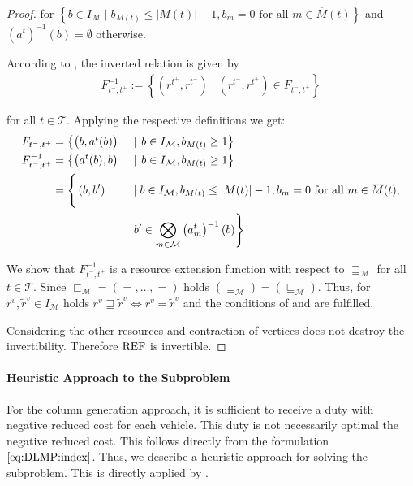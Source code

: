 \begin{proof}
for $\left\{b\in I_{\mathcal{M}}\mid b_{M(t)}\leq\vert M(t)\vert - 1, b_m=0 \text{ for all } m\in\overline{M}(t)\right\}$ and $\left(a^t\right)^{-1}(b) = \emptyset$ otherwise.

According to , the inverted relation is given by
\begin{align*}
	F^{-1}_{t^-,t^+} := \left\{\left(r^{t^+},r^{t^-}\right)\mid \left(r^{t^-},r^{t^+}\right)\in F_{t^-,t^+}\right\}
\end{align*}

for all $t\in\mathcal{T}$. Applying the respective definitions we get:
\begin{align*}
	F_{t^-,t^+} & = \left\{\left(b, a^t(b)\right)\right. && \mid \left. b\in I_{\mathcal{M}}, b_{M(t)}\geq 1\right\} \\
	F^{-1}_{t^-,t^+} & = \left\{\left(a^t(b), b\right)\right. && \mid \left. b\in I_{\mathcal{M}}, b_{M(t)}\geq 1\right\} \\
	& = \left\{\vphantom{\bigotimes_{m\in\mathcal{M}}}\left(b, b'\right)\right. && \mid b\in I_{\mathcal{M}}, b_{M(t)}\leq\vert M(t)\vert-1, b_m=0 \text{ for all } m\in\overline{M}(t), \\
	&&& \left. b'\in\bigotimes_{m\in\mathcal{M}}\left(a^t_m\right)^{-1}(b)\right\}
\end{align*}

We show that $F^{-1}_{t^-,t^+}$ is a resource extension function with respect to $\sqsupseteq_{\mathcal{M}}$ for all $t\in\mathcal{T}$. Since ${\sqsubset_{\mathcal{M}} = \left(=,\dots,=\right)}$ holds ${\left(\sqsupseteq_{\mathcal{M}}\right) = \left(\sqsubseteq_{\mathcal{M}}\right)}$. Thus, for ${r^v,\tilde{r}^v\in I_{\mathcal{M}}}$ holds ${r^v\sqsupseteq\tilde{r}^v\Leftrightarrow r^v = \tilde{r}^v}$ and the conditions of  and  are fulfilled.

Considering the other resources and contraction of vertices does not destroy the invertibility. Therefore $\operatorname{REF}$ is invertible.
%
\end{proof}

\newpage

\paragraph{Heuristic Approach to the Subproblem} \parfill

For the column generation approach, it is sufficient to receive a duty with negative reduced cost for each vehicle. This duty is not necessarily optimal \wrt the negative reduced cost. This follows directly from the formulation $\eqref{eq:DLMP:index}$. Thus, we describe a heuristic approach for solving the subproblem. This is directly applied by \cite[pp.~104-107]{Kaiser}.

